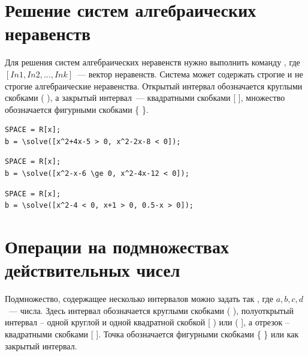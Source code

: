 
\section{Решение систем алгебраических неравенств}

Для решения систем алгебраических неравенств нужно выполнить команду , где $[In1, In2, ..., Ink]$~--- вектор неравенств.
Система может содержать строгие и не строгие алгебраические неравенства. Открытый интервал обозначается круглыми скобками ( ), а закрытый интервал~--- квадратными скобками [ ], множество обозначается фигурными скобками \{ \}.

\begin{verbatim}
SPACE = R[x];
b = \solve([x^2+4x-5 > 0, x^2-2x-8 < 0]);
\end{verbatim}


\begin{verbatim}
SPACE = R[x];
b = \solve([x^2-x-6 \ge 0, x^2-4x-12 < 0]);
\end{verbatim}

\ex{$SPACE=R[x]; $\\
\hspace*{4mm} $b=solve([x^2-x-6 \ge 0, x^2-4x-12 < 0]);$}{$(-4,-2]\cup[3,4)$.}

\begin{verbatim}
SPACE = R[x];
b = \solve([x^2-4 < 0, x+1 > 0, 0.5-x > 0]);
\end{verbatim}


\section{Операции на подмножествах действительных чисел}

Подмножество, содержащее несколько интервалов можно задать так 
\comm{set}{((a,b),(c,d])} , где $a,b,c,d$~--- числа.
Здесь интервал обозначается круглыми скобками ( ), полуоткрытый интервал -- одной круглой и одной квадратной скобкой [ ) или ( ],
а отрезок --   квадратными скобками [ ]. Точка обозначается фигурными скобками \{ \} или как закрытый интервал.

